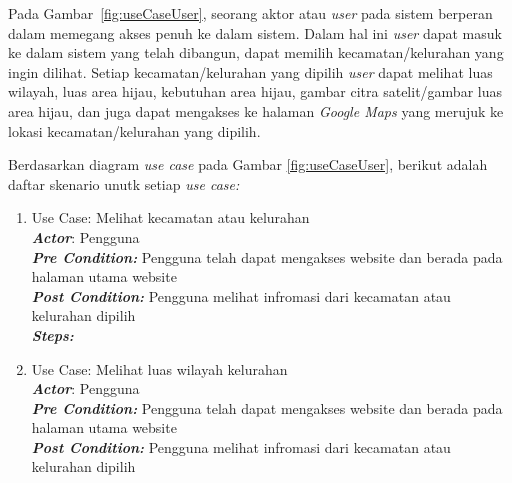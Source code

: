Pada Gambar~\ref{fig:useCaseUser}, seorang aktor atau \textit{user} pada sistem berperan dalam memegang akses penuh ke dalam sistem. Dalam hal ini \textit{user} dapat masuk ke dalam sistem yang telah dibangun, dapat memilih kecamatan/kelurahan yang ingin dilihat. Setiap kecamatan/kelurahan yang dipilih \textit{user} dapat melihat luas wilayah, luas area hijau, kebutuhan area hijau, gambar citra satelit/gambar luas area hijau, dan juga dapat mengakses ke halaman \textit{Google Maps} yang merujuk ke lokasi kecamatan/kelurahan yang dipilih.
	
Berdasarkan diagram \textit{use case }pada Gambar \ref{fig:useCaseUser}, berikut adalah daftar skenario unutk setiap \textit{use case:}	

\begin{enumerate}
	\item Use Case: Melihat kecamatan atau kelurahan \\
	\textit{\textbf{Actor}}: Pengguna \\
	\textit{\textbf{Pre Condition: }}Pengguna telah dapat mengakses website dan berada pada halaman utama website\\
	\textit{\textbf{Post Condition:}} Pengguna melihat infromasi dari kecamatan atau kelurahan dipilih\\
	\textit{\textbf{Steps: }}
	\begin{table}[H]
		\centering
		
	\end{table}
	
	\item Use Case: Melihat luas wilayah kelurahan\\
	\textit{\textbf{Actor}}: Pengguna \\
	\textit{\textbf{Pre Condition: }}Pengguna telah dapat mengakses website dan berada pada halaman utama website\\
	\textit{\textbf{Post Condition:}} Pengguna melihat infromasi dari kecamatan atau kelurahan dipilih\\
	

\end{enumerate}
